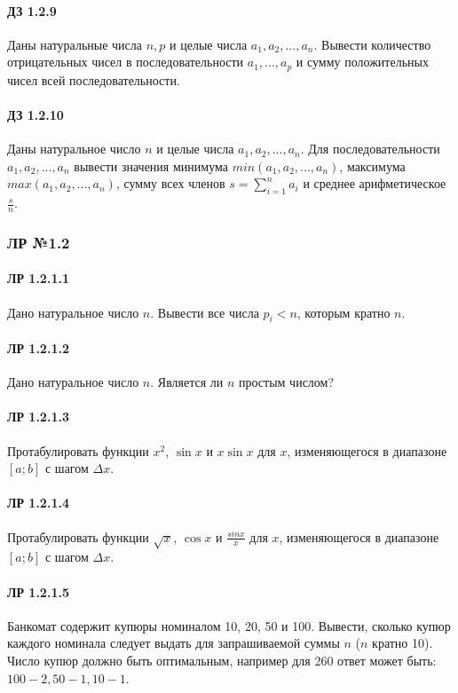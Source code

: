 \documentclass[12pt,a4paper]{report}
\begin{document}
\paragraph*{ДЗ 1.2.9} Даны натуральные числа $n, p$ и целые числа $a_1, a_2, ..., a_n$. Вывести количество отрицательных чисел в последовательности $a_1, ..., a_p$ и сумму положительных чисел всей последовательности.
\paragraph*{ДЗ 1.2.10} Даны натуральное число $n$ и целые числа $a_1, a_2, ..., a_n$. Для последовательности $a_1, a_2, ..., a_n$ вывести значения минимума $min(a_1, a_2, ..., a_n)$, максимума $max(a_1, a_2, ..., a_n)$, сумму всех членов $s = \sum \limits_{i=1}^{n}{a_i}$ и среднее арифметическое $\frac {s} {n}$.


\clearpage
\subsubsection*{ЛР №1.2}
\paragraph*{ЛР 1.2.1.1} Дано натуральное число $n$. Вывести все числа $p_i < n$, которым кратно $n$.
\paragraph*{ЛР 1.2.1.2} Дано натуральное число $n$. Является ли $n$ простым числом?
\paragraph*{ЛР 1.2.1.3} Протабулировать функции $x^2$, $\sin x$ и $x \sin x$ для $x$, изменяющегося в диапазоне $[a; b]$ с шагом $\Delta x$.
\paragraph*{ЛР 1.2.1.4} Протабулировать функции $\sqrt{x}$, $\cos x$ и $\frac {sin x} {x} $ для $x$, изменяющегося в диапазоне $[a; b]$ с шагом $\Delta x$.
\paragraph*{ЛР 1.2.1.5} Банкомат содержит купюры номиналом 10, 20, 50 и 100. Вывести, сколько купюр каждого номинала следует выдать для запрашиваемой суммы $n$ ($n$ кратно 10). Число купюр должно быть оптимальным, например для 260 ответ может быть: $100 - 2, 50 - 1, 10 - 1$.
\end{document}
